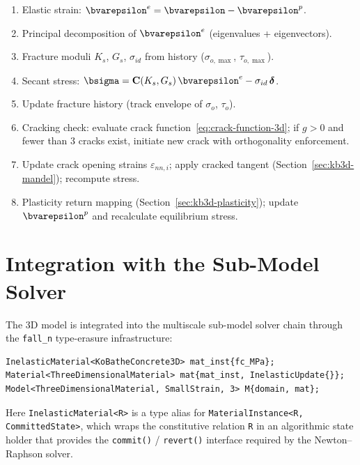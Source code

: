 \begin{enumerate}
  \item Elastic strain: $\bvarepsilon^e = \bvarepsilon - \bvarepsilon^p$.
  \item Principal decomposition of $\bvarepsilon^e$ (eigenvalues + eigenvectors).
  \item Fracture moduli $K_s$, $G_s$, $\sigma_{id}$ from history
        ($\sigma_{o,\max}$, $\tau_{o,\max}$).
  \item Secant stress: $\bsigma = \mathbf{C}(K_s, G_s)\,\bvarepsilon^e
        - \sigma_{id}\,\boldsymbol{\delta}$.
  \item Update fracture history (track envelope of $\sigma_o$, $\tau_o$).
  \item Cracking check: evaluate crack function~\eqref{eq:crack-function-3d};
        if $g > 0$ and fewer than 3 cracks exist, initiate new crack with
        orthogonality enforcement.
  \item Update crack opening strains $\varepsilon_{nn,i}$; apply cracked
        tangent (Section~\ref{sec:kb3d-mandel}); recompute stress.
  \item Plasticity return mapping
        (Section~\ref{sec:kb3d-plasticity}); update $\bvarepsilon^p$ and
        recalculate equilibrium stress.
\end{enumerate}


\section{Integration with the Sub-Model Solver}
\label{sec:kb3d-integration}

The 3D model is integrated into the multiscale sub-model solver chain
through the \texttt{fall\_n} type-erasure infrastructure:

\begin{lstlisting}
InelasticMaterial<KoBatheConcrete3D> mat_inst{fc_MPa};
Material<ThreeDimensionalMaterial> mat{mat_inst, InelasticUpdate{}};
Model<ThreeDimensionalMaterial, SmallStrain, 3> M{domain, mat};
\end{lstlisting}

Here \texttt{InelasticMaterial<R>} is a type alias for
\texttt{MaterialInstance<R, CommittedState>}, which wraps the constitutive
relation \texttt{R} in an algorithmic state holder that provides the
\texttt{commit()} / \texttt{revert()} interface required by the Newton--Raphson
solver.

